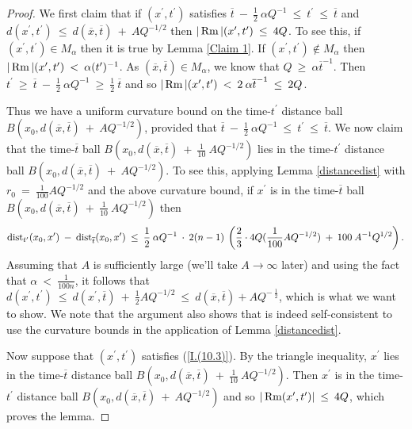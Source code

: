 \begin{proof}
We first claim that if $(x^\prime, t^\prime)$ satisfies
$\overline{t} \: - \: \frac12 \: \alpha Q^{-1} \: \le \: t^\prime \: \le \:
\overline{t}$ and $d(x^\prime, t^\prime) \: \le \: d(\overline{x}, \overline{t})
\: + \: A Q^{-1/2}$ then $|\operatorname{Rm}|(x^\prime, t^\prime) \: \le \: 4Q$. To see this,
if $(x^\prime, t^\prime) \in M_\alpha$ then it is true by Lemma \ref{Claim 1}.  If
$(x^\prime, t^\prime) \notin M_\alpha$ then
$|\operatorname{Rm}|(x^\prime, t^\prime) \: < \: \alpha (t^\prime)^{-1}$.
As $(\overline{x}, \overline{t}) \in M_\alpha$, we know that
$Q \: \ge \: \alpha \overline{t}^{-1}$. Then $t^\prime \: \ge \:
\overline{t} \: - \: \frac12 \: \alpha Q^{-1} \: \ge \:
\frac12 \: \overline{t}$ and so $|\operatorname{Rm}|(x^\prime, t^\prime) \: < \: 2 \:
\alpha \overline{t}^{-1} \: \le \: 2Q$.

Thus we have a uniform curvature bound on the time-$t^\prime$ distance ball
$B(x_0, d(\overline{x}, \overline{t})
\: + \: A Q^{-1/2})$, provided that
$\overline{t} \: - \: \frac12 \: \alpha Q^{-1} \: \le \: t^\prime \: \le \:
\overline{t}$. We now claim that the time-$\overline{t}$ ball
$B(x_0, d(\overline{x}, \overline{t})
\: + \: \frac{1}{10} \: A Q^{-1/2})$ lies in the time-$t^\prime$ distance ball
$B(x_0, d(\overline{x}, \overline{t})
\: + \: A Q^{-1/2})$. To see this,
applying Lemma \ref{distancedist} with $r_0 \: = \:
\frac{1}{100} A Q^{-1/2}$ and the above curvature bound, if
$x^\prime$ is in the time-$\overline{t}$ ball
$B(x_0, d(\overline{x}, \overline{t})
\: + \: \frac{1}{10} \: A Q^{-1/2})$ then
\begin{equation} \label{32.4}
\operatorname{dist}_{t^\prime}(x_0, x^\prime) \: - \:
\operatorname{dist}_{\overline{t}}(x_0, x^\prime) \: \le \:
\frac12 \: \alpha Q^{-1} \: \cdot \: 2(n-1) \:
\left( \frac23 \cdot 4Q ( \frac{1}{100} A Q^{-1/2}) \: + \:
100 \: A^{-1} Q^{1/2} \right).
\end{equation}
Assuming that $A$ is sufficiently large
(we'll take $A \rightarrow \infty$ later)
and using the fact that $\alpha \: < \: \frac{1}{100n}$, it follows that
$d(x^\prime, t^\prime) \: \le \:
d(x^\prime, \overline{t}) \: + \:
\frac{1}{2} A Q^{-1/2} \: \le \:
d(\overline{x},\overline{t}) + A Q^{- \: \frac12}$,
which is what we want to show.  We note that
the argument also shows that is indeed self-consistent to use the curvature
bounds in the application of Lemma \ref{distancedist}.

Now suppose that  $(x^\prime, t^\prime)$ satisfies
(\ref{I.(10.3)}). By the triangle inequality,
$x^\prime$ lies in the time-$\overline{t}$ distance ball
$B(x_0, d(\overline{x}, \overline{t}) \: + \: \frac{1}{10} \: A Q^{-1/2})$.
Then $x^\prime$ is in the time-$t^\prime$ distance ball
$B(x_0, d(\overline{x}, \overline{t})
\: + \: A Q^{-1/2})$ and so $|\operatorname{Rm}(x^\prime, t^\prime)| \: \le \: 4Q$,
which proves the lemma.
\end{proof}

